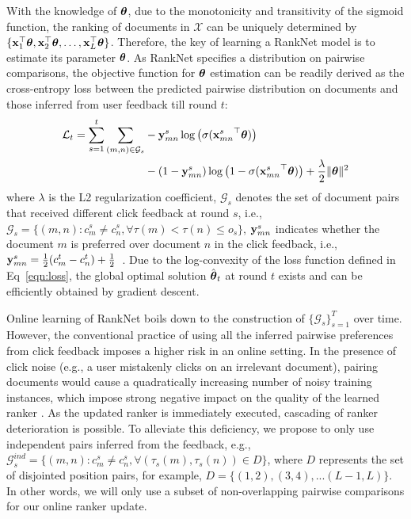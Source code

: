With the knowledge of $\boldsymbol{\theta}$, due to the monotonicity and transitivity of the sigmoid function, the ranking of documents in $\mathcal{X}$ can be uniquely determined by $\{{\mathbf{x}^\top_1}\boldsymbol{\theta}, {\mathbf{x}^\top_2}\boldsymbol{\theta}, \dots, {\mathbf{x}^\top_{L}}\boldsymbol{\theta}\}$. Therefore, the key of learning a RankNet model is to estimate its parameter $\boldsymbol{\theta}$. As RankNet specifies a distribution on pairwise comparisons, the objective function for $\boldsymbol{\theta}$ estimation can be readily derived as the cross-entropy loss between the predicted pairwise distribution on documents and those inferred from user feedback till round $t$:
\small
\begin{align}
\label{eqn:loss}
    \mathcal{L}_t = \sum_{s=1}^t\sum_{(m, n) \in \mathcal{G}_{s}} & - {\mathbf{y}_{mn}^s} \log\big(\sigma({{\mathbf{x}_{mn}^s}}^\top\boldsymbol{\theta})\big)  \\
    & - (1 - {\mathbf{y}_{mn}^s})\log\big(1 - \sigma({{\mathbf{x}_{mn}^s}}^\top\boldsymbol{\theta})\big) + \frac{\lambda}{2} \Vert\boldsymbol{\theta}\Vert^2 \nonumber 
\end{align}
\normalsize
where $\lambda$ is the L2 regularization coefficient, $\mathcal{G}_{s}$ denotes the set of document pairs that received different click feedback at round $s$, i.e., $\mathcal{G}_{s} = \{(m, n): c_m^{s} \neq c_n^{s}, \forall \tau(m) < \tau(n) \leq o_{s}\}$, ${\mathbf{y}_{mn}^s}$ indicates whether the document $m$ is preferred over document $n$ in the click feedback, i.e., ${\mathbf{y}_{mn}^s} = \frac{1}{2}(c_m^t - c_n^t) + \frac{1}{2}$~\cite{burges2010ranknet}. Due to the log-convexity of the loss function defined in Eq~\eqref{eqn:loss}, the global optimal solution $\hat{\boldsymbol{\theta}}_t$ at round $t$ exists and can be efficiently obtained by gradient descent. 
 
Online learning of RankNet boils down to the construction of $\{\mathcal{G}_{s}\}^T_{s=1}$ over time. However, the conventional practice of using all the inferred pairwise preferences from click feedback \cite{joachims2002optimizing,agichtein2006improving} imposes a higher risk in an online setting. In the presence of click noise (e.g., a user mistakenly clicks on an irrelevant document), pairing documents would cause a quadratically increasing number of noisy training instances, which impose strong negative impact on the quality of the learned ranker \cite{carvalho2008suppressing}. As the updated ranker is immediately executed, cascading of ranker deterioration is possible. 
To alleviate this deficiency, we propose to only use independent pairs inferred from the feedback, e.g., $\mathcal{G}_{s}^{ind} = \{(m, n): c_m^{s} \neq c_n^{s}, \forall (\tau_s(m), \tau_s(n)) \in D\}$, where $D$ represents the set of disjointed position pairs, for example, $D = \{(1, 2), (3, 4), ... (L-1, L)\}$. In other words, we will only use a subset of non-overlapping pairwise comparisons for our online ranker update. 

